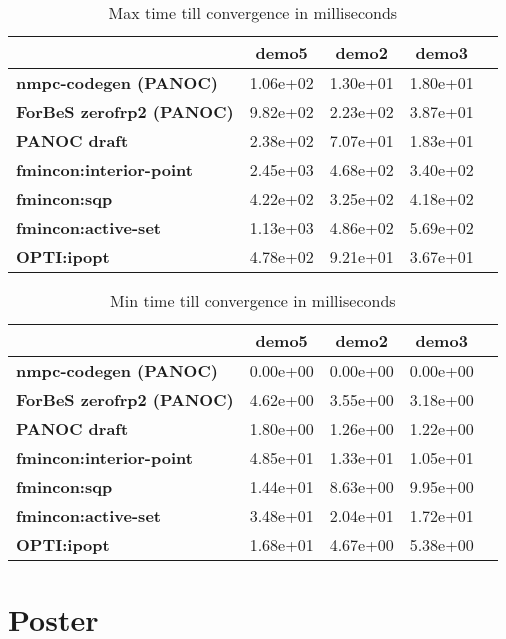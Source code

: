 \begin{table}[H]
	\centering
	\begin{tabular}{|l|c|c|c|c|}
		\hline
		&\textbf{demo5}&\textbf{demo2}&\textbf{demo3}\\\hline
		\textbf{nmpc-codegen (PANOC)}&1.06e+02&1.30e+01&1.80e+01\\\hline
		\textbf{ForBeS zerofrp2 (PANOC)}&9.82e+02&2.23e+02&3.87e+01\\\hline
		\textbf{PANOC draft}&2.38e+02&7.07e+01&1.83e+01\\\hline
		\textbf{fmincon:interior-point}&2.45e+03&4.68e+02&3.40e+02\\\hline
		\textbf{fmincon:sqp}&4.22e+02&3.25e+02&4.18e+02\\\hline
		\textbf{fmincon:active-set}&1.13e+03&4.86e+02&5.69e+02\\\hline
		\textbf{OPTI:ipopt}&4.78e+02&9.21e+01&3.67e+01\\\hline
	\end{tabular}
	\caption{Max time till convergence in milliseconds}
	\label{tbl:max time till convergence with noise}
\end{table}

\begin{table}[H]
	\centering
	\begin{tabular}{|l|	c|c|c|c|}
		\hline
		&\textbf{demo5}&\textbf{demo2}&\textbf{demo3}\\\hline
		\textbf{nmpc-codegen (PANOC)}&0.00e+00&0.00e+00&0.00e+00\\\hline
		\textbf{ForBeS zerofrp2 (PANOC)}&4.62e+00&3.55e+00&3.18e+00\\\hline
		\textbf{PANOC draft}&1.80e+00&1.26e+00&1.22e+00\\\hline
		\textbf{fmincon:interior-point}&4.85e+01&1.33e+01&1.05e+01\\\hline
		\textbf{fmincon:sqp}&1.44e+01&8.63e+00&9.95e+00\\\hline
		\textbf{fmincon:active-set}&3.48e+01&2.04e+01&1.72e+01\\\hline
		\textbf{OPTI:ipopt}&1.68e+01&4.67e+00&5.38e+00\\\hline
	\end{tabular}
	\caption{Min time till convergence in milliseconds}
	\label{tbl:min time till convergence with noise}
\end{table}

\chapter{Poster}
